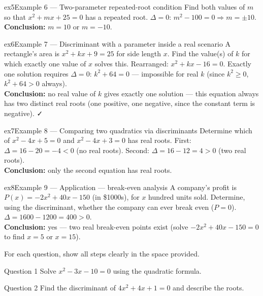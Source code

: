 \documentclass[11pt]{article}
\begin{document}
\begin{example}{ex5}{Example 6 --- Two-parameter repeated-root condition}
Find both values of $m$ so that $x^2+mx+25=0$ has a repeated root.\soln
$\Delta=0$: $m^2-100=0\Rightarrow m=\pm10$.\\[3pt]\textbf{Conclusion:} $m=10$ or $m=-10$.
\end{example}

\begin{example}{ex6}{Example 7 --- Discriminant with a parameter inside a real scenario}
A rectangle's area is $x^2+kx+9=25$ for side length $x$. Find the value(s) of $k$ for which exactly one value of $x$ solves this.\soln
Rearranged: $x^2+kx-16=0$. Exactly one solution requires $\Delta=0$: $k^2+64=0$ --- impossible for real $k$ (since $k^2\geq0$, $k^2+64>0$ always).\\[3pt]\textbf{Conclusion:} no real value of $k$ gives exactly one solution --- this equation always has two distinct real roots (one positive, one negative, since the constant term is negative). ✓
\end{example}

\begin{example}{ex7}{Example 8 --- Comparing two quadratics via discriminants}
Determine which of $x^2-4x+5=0$ and $x^2-4x+3=0$ has real roots.\soln
First: $\Delta=16-20=-4<0$ (no real roots). Second: $\Delta=16-12=4>0$ (two real roots).\\[3pt]\textbf{Conclusion:} only the second equation has real roots.
\end{example}

\begin{example}{ex8}{Example 9 --- Application --- break-even analysis}
A company's profit is $P(x)=-2x^2+40x-150$ (in \$1000s), for $x$ hundred units sold. Determine, using the discriminant, whether the company can ever break even ($P=0$).\soln
$\Delta=1600-1200=400>0$.\\[3pt]\textbf{Conclusion:} yes --- two real break-even points exist (solve $-2x^2+40x-150=0$ to find $x=5$ or $x=15$).
\end{example}

\clearpage
{}
For each question, show all steps clearly in the space provided.

\begin{qbox}{Question 1}
Solve $x^2-3x-10=0$ using the quadratic formula.\workspace{2.4cm}
\end{qbox}

\begin{qbox}{Question 2}
Find the discriminant of $4x^2+4x+1=0$ and describe the roots.\workspace{2.4cm}
\end{qbox}
\end{document}
